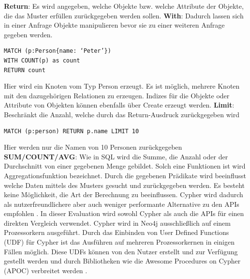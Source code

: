 \textbf{Return}: Es wird angegeben, welche Objekte bzw. welche Attribute der Objekte, die das Muster erfüllen zurückgegeben werden sollen.\newline
\textbf{With}: Dadurch lassen sich in einer Anfrage Objekte manipulieren bevor sie zu einer weiteren Anfrage gegeben werden. 
\begin{Verbatim}[frame=single]
MATCH (p:Person{name: ‘Peter’})  
WITH COUNT(p) as count  
RETURN count
\end{Verbatim} 
Hier wird ein Knoten vom Typ Person erzeugt. Es ist möglich, mehrere Knoten mit den dazugehörigen Relationen zu erzeugen. Indizes  für die Objekte oder Attribute von Objekten können ebenfalls über Create erzeugt werden.\newline
\textbf{Limit}: Beschränkt die Anzahl, welche durch das Return-Ausdruck zurückgegeben wird 
\begin{Verbatim}[frame=single]
MATCH (p:person) RETURN p.name LIMIT 10
\end{Verbatim}
Hier werden nur die Namen  von 10 Personen zurückgegeben\newline
\textbf{SUM/COUNT/AVG}: Wie in SQL wird die Summe, die Anzahl oder der Durchschnitt von einer gegebenen Menge gebildet. Solch eine Funktionen ist wird Aggregationsfunktion bezeichnet. \newline 
Durch die gegebenen Prädikate wird beeinflusst welche Daten mittels des Musters gesucht und zurückgegeben werden. Es besteht keine Möglichkeit, die Art der Berechnung zu beeinflussen. Cypher wird dadurch als nutzerfreundlichere aber auch weniger performante Alternative zu den APIs empfohlen \parencite{vukotic2015neo4j}. In dieser Evaluation wird sowohl Cypher als auch die APIs für einen direkten Vergleich verwendet. Cypher wird in Neo4j ausschließlich auf einem Prozessorkern ausgeführt. Durch das Einbinden von User Defined Functions (UDF) für Cypher ist das Ausführen auf mehreren Prozessorkernen in einigen Fällen möglich. Diese UDFs können von den Nutzer erstellt und zur Verfügung gestellt werden und  durch Bibliotheken wie die Awesome Procedures on Cypher (APOC) verbreitet werden \parencite{APOC}.

